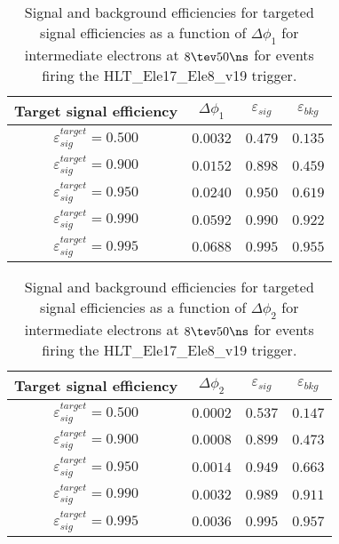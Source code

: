 \clearpage

\begin{table}[!bht]
  \begin{center}
    \begin{tabular}{cccc}
      \hline
      Target signal efficiency & $\Delta\phi_1$ & $\varepsilon_{sig}$ & $\varepsilon_{bkg}$ \\ 
      \hline
      $\varepsilon_{sig}^{target} = 0.500$ & $  0.0032$ & $0.479$ & $0.135$ \\
      $\varepsilon_{sig}^{target} = 0.900$ & $  0.0152$ & $0.898$ & $0.459$ \\
      $\varepsilon_{sig}^{target} = 0.950$ & $  0.0240$ & $0.950$ & $0.619$ \\
      $\varepsilon_{sig}^{target} = 0.990$ & $  0.0592$ & $0.990$ & $0.922$ \\
      $\varepsilon_{sig}^{target} = 0.995$ & $  0.0688$ & $0.995$ & $0.955$ \\
      \hline
    \end{tabular}
    \caption{Signal and background efficiencies for targeted signal efficiencies as a function of $\Delta\phi_1$ for intermediate electrons at $8\tev 50\ns$ for events firing the HLT\_Ele17\_Ele8\_v19 trigger.}
    \label{tab:eff_rej_phi1_beam_8_50_trigger_17_8_I}
  \end{center}
\end{table}

\clearpage

\begin{table}[!bht]
  \begin{center}
    \begin{tabular}{cccc}
      \hline
      Target signal efficiency & $\Delta\phi_2$ & $\varepsilon_{sig}$ & $\varepsilon_{bkg}$ \\ 
      \hline
      $\varepsilon_{sig}^{target} = 0.500$ & $  0.0002$ & $0.537$ & $0.147$ \\
      $\varepsilon_{sig}^{target} = 0.900$ & $  0.0008$ & $0.899$ & $0.473$ \\
      $\varepsilon_{sig}^{target} = 0.950$ & $  0.0014$ & $0.949$ & $0.663$ \\
      $\varepsilon_{sig}^{target} = 0.990$ & $  0.0032$ & $0.989$ & $0.911$ \\
      $\varepsilon_{sig}^{target} = 0.995$ & $  0.0036$ & $0.995$ & $0.957$ \\
      \hline
    \end{tabular}
    \caption{Signal and background efficiencies for targeted signal efficiencies as a function of $\Delta\phi_2$ for intermediate electrons at $8\tev 50\ns$ for events firing the HLT\_Ele17\_Ele8\_v19 trigger.}
    \label{tab:eff_rej_phi2_beam_8_50_trigger_17_8_I}
  \end{center}
\end{table}

